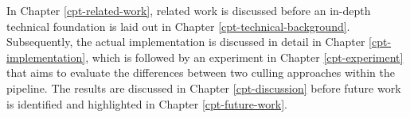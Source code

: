 \clearpage

\noindent
In Chapter \ref{cpt-related-work}, related work is discussed before an in-depth technical foundation 
is laid out in Chapter \ref{cpt-technical-background}. Subsequently, the actual implementation is discussed 
in detail in Chapter \ref{cpt-implementation}, which is followed by an experiment in Chapter \ref{cpt-experiment} 
that aims to evaluate the differences between two culling approaches within the pipeline. The results are 
discussed in Chapter \ref{cpt-discussion} before future work is identified and highlighted in Chapter 
\ref{cpt-future-work}. 
